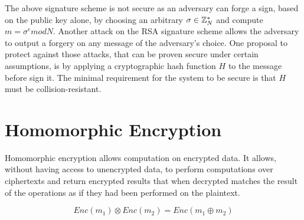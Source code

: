 The above signature scheme is not secure as an adversary can forge a sign, based on the public key alone, by choosing an arbitrary $\sigma \in \mathbb{Z}^{*}_{N}$ and compute $m = \sigma^{e}modN$. Another attack on the RSA signature scheme allows the adversary to output a forgery on any message of the adversary's choice. One proposal to protect against those attacks, that can be proven secure under certain assumptions, is by applying a cryptographic hash function $H$ to the message before sign it. The minimal requirement for the system to be secure is that $H$ must be collision-resistant.

\section{Homomorphic Encryption}
\label{preliminaries:homo}

Homomorphic encryption allows computation on encrypted data. It allows, without having access to unencrypted data, to perform computations over ciphertexts and return encrypted results that when decrypted matches the result of the operations as if they had been performed on the plaintext.

\begin{equation*}
  Enc(m_1) \otimes Enc(m_2) = Enc(m_1 \oplus m_2)
\end{equation*}
